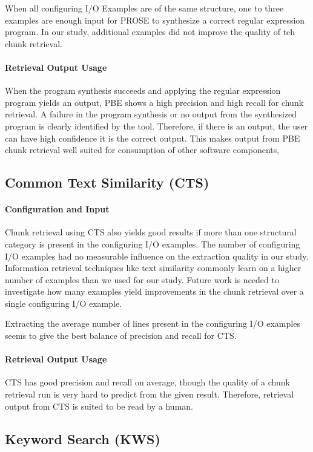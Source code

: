 \documentclass[\myrootdir/main.tex]{subfiles}
\begin{document}
When all configuring I/O Examples are of the same structure, one to three examples are enough input for PROSE to synthesize a correct regular expression program. In our study, additional examples did not improve the quality of teh chunk retrieval.

\paragraph{Retrieval Output Usage}
When the program synthesis succeeds and applying the regular expression program yields an output, PBE shows a high precision and high recall for chunk retrieval.
A failure in the program synthesis or no output from the synthesized program is clearly identified by the tool.
Therefore, if there is an output, the user can have high confidence it is the correct output.
This makes output from PBE chunk retrieval well suited for consumption of other software components,

\subsection{Common Text Similarity (CTS)}
\paragraph{Configuration and Input}
Chunk retrieval using CTS also yields good results if more than one structural category is present in the configuring I/O examples.
The number of configuring I/O examples had no measurable influence on the extraction quality in our study.
Information retrieval techniques like text similarity commonly learn on a higher number of examples than we used for our study.
Future work is needed to investigate how many examples yield improvements in the chunk retrieval over a single configuring I/O example.

Extracting the average number of lines present in the configuring I/O examples seems to give the best balance of precision and recall for CTS.

\paragraph{Retrieval Output Usage}
CTS has good precision and recall on average, though the quality of a chunk retrieval run is very hard to predict from the given result.
Therefore, retrieval output from CTS is suited to be read by a human.

\subsection{Keyword Search (KWS)}
\end{document}
